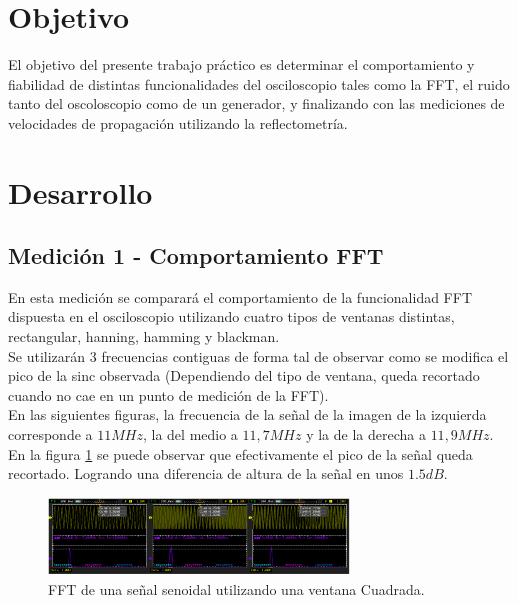 \documentclass[a4paper,10pt]{article}
\title{  }
\begin{document}
	\maketitle %
	\newpage

	\tableofcontents %
	\newpage
	

	\section{Objetivo}
	
	\indent	El objetivo del presente trabajo práctico es determinar el 
	comportamiento y fiabilidad de distintas funcionalidades del osciloscopio 
	tales como la FFT, el ruido tanto del oscoloscopio como de un generador, 
	y finalizando con las mediciones de velocidades de propagación utilizando 
	la reflectometría.
	
	\newpage
	\section{Desarrollo}

	\subsection{Medición 1 - Comportamiento FFT}
	\indent En esta medición se comparará el comportamiento de la funcionalidad
	FFT dispuesta en el osciloscopio utilizando cuatro tipos de ventanas 
	distintas, rectangular, hanning, hamming y blackman.\\
	\indent Se utilizarán 3 frecuencias contiguas de forma tal de observar como
	se modifica el pico de la sinc observada (Dependiendo del tipo de ventana, 
	queda recortado cuando no cae en un punto de medición de la FFT). \\
	\indent En las siguientes figuras, la frecuencia de la señal de la imagen de
	la izquierda corresponde a $11MHz$, la del medio a $11,7MHz$ y la de la 
	derecha a $11,9MHz$.\\
	\indent En la figura \ref{img001} se puede observar que efectivamente el 
	pico de la señal queda recortado. Logrando una diferencia de altura de la 
	señal en unos $1.5dB$.

	\begin{figure}[!htb]
		\centering
		\includegraphics[width=8cm]
		{Imagenes/RectangularWindow.png}
		\caption{FFT de una señal senoidal utilizando una ventana Cuadrada.}
		\label{img001}
	\end{figure}
\end{document}
